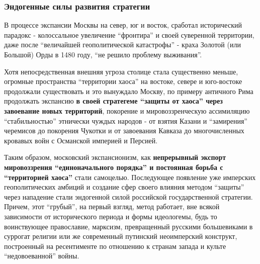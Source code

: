  
 
 
 
 

\subsubsection{Эндогенные силы развития стратегии}

В процессе экспансии Москвы на север, юг и восток, сработал исторический
парадокс - колоссальное увеличение \enquote{фронтира} и своей суверенной территории,
даже после \enquote{величайшей геополитической катастрофы} - краха Золотой (или
Большой) Орды в 1480 году, \enquote{не решило проблему выживания}.

Хотя непосредственная внешняя угроза столице стала существенно меньше, огромные
пространства \enquote{территории хаоса} на востоке, севере и юго-востоке продолжали
существовать и это вынуждало Москву, по примеру античного Рима продолжать
экспансию \textbf{в своей стратегеме \enquote{защиты от хаоса} через завоевание новых
территорий}, покорение и мировоззренческую ассимиляцию \enquote{стабильностью} этнически
чуждых народов - от взятия Казани и \enquote{замирения} черемисов до покорения Чукотки
и от завоевания Кавказа до многочисленных кровавых войн с Османской империей и
Персией.

Таким образом, московский экспансионизм, как \textbf{непрерывный экспорт мировоззрения
\enquote{единоначального порядка} и постоянная борьба с \enquote{территорией хаоса}} стали
самоцелью. Последующее появление уже имперских геополитических амбиций и
создание сфер своего влияния методом \enquote{защиты} через нападение стали эндогенной
силой российской государственной стратегии. Причем, этот \enquote{грубый}, на первый
взгляд, метод работает, вне всякой зависимости от исторического периода и формы
идеологемы, будь то воинствующее православие, марксизм, превращенный русскими
большевиками в суррогат религии или же современный путинский неоимперский
конструкт, построенный на ресентименте по отношению к странам запада и культе
\enquote{недовоеванной} войны.
